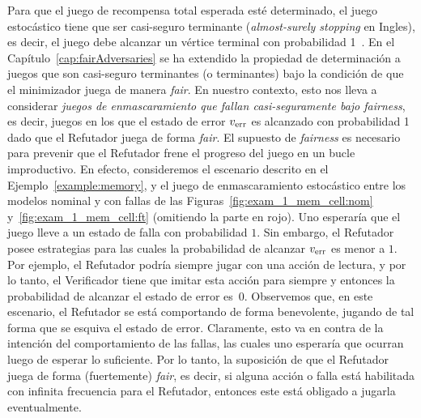 Para que el juego de recompensa total esperada esté determinado, el juego estocástico tiene que ser casi-seguro terminante (\textit{almost-surely stopping} en Ingles), es decir, el juego debe alcanzar un vértice terminal con probabilidad
1~\cite{FilarV96}.  En el Capítulo~\ref{cap:fairAdversaries} se ha extendido la propiedad de determinación a juegos que son casi-seguro terminantes (o terminantes) bajo la condición de que el minimizador juega de manera \emph{fair}.
%
En nuestro contexto, esto nos lleva a considerar \emph{juegos de enmascaramiento que fallan casi-seguramente bajo fairness}, es decir, juegos en los que el estado de error
$v_{\text{err}}$ es alcanzado con probabilidad 1 dado que el Refutador juega de forma \emph{fair}.
%
El supuesto de \emph{fairness} es necesario para prevenir que el Refutador frene el progreso del juego en un bucle improductivo.
%
En efecto, consideremos el escenario descrito en el Ejemplo~\ref{example:memory}, y el juego de enmascaramiento estocástico entre los modelos nominal y con fallas de las Figuras~\ref{fig:exam_1_mem_cell:nom} y~\ref{fig:exam_1_mem_cell:ft} (omitiendo la parte en rojo).
Uno esperaría que el juego lleve a un estado de falla con probabilidad $1$.
Sin embargo, el Refutador posee estrategias para las cuales la probabilidad de alcanzar $v_{\text{err}}$ es menor a $1$.  Por ejemplo, el Refutador podría siempre jugar con una acción de lectura, y por lo tanto, el Verificador tiene que imitar esta acción para siempre y entonces la probabilidad de alcanzar el estado de error es~$0$.
%
Observemos que, en este escenario, el Refutador se está comportando de forma benevolente, jugando de tal forma que se esquiva el estado de error.
Claramente, esto va en contra de la intención del comportamiento de las fallas, las cuales uno esperaría que ocurran luego de esperar lo suficiente.
%
Por lo tanto, la suposición de que el Refutador juega de forma (fuertemente) \emph{fair}, es decir, 
si alguna acción o falla está habilitada con infinita frecuencia para el Refutador, entonces este está obligado a jugarla eventualmente.

